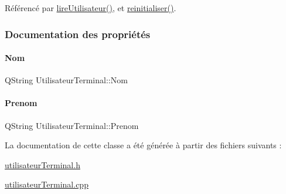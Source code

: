 Référencé par \hyperlink{class_utilisateur_terminal_a196420ecc14bc0645e3e1c66d796b8e6}{lire\+Utilisateur()}, et \hyperlink{class_utilisateur_terminal_a63b37fa7cbf08976e5a09cbfbdb55f42}{reinitialiser()}.



\subsubsection{Documentation des propriétés}
\mbox{\label{class_utilisateur_terminal_a92c24246effeafa1a9ea0923f13c20e8}} 
\paragraph{\texorpdfstring{Nom}{Nom}}
{\footnotesize\ttfamily Q\+String Utilisateur\+Terminal\+::\+Nom}

\mbox{\label{class_utilisateur_terminal_a42d3d48105b486ce0fd89bcef40f8573}} 
\paragraph{\texorpdfstring{Prenom}{Prenom}}
{\footnotesize\ttfamily Q\+String Utilisateur\+Terminal\+::\+Prenom}



La documentation de cette classe a été générée à partir des fichiers suivants \+:\begin{DoxyCompactItemize}
\item 
\hyperlink{utilisateur_terminal_8h}{utilisateur\+Terminal.\+h}\item 
\hyperlink{utilisateur_terminal_8cpp}{utilisateur\+Terminal.\+cpp}\end{DoxyCompactItemize}
